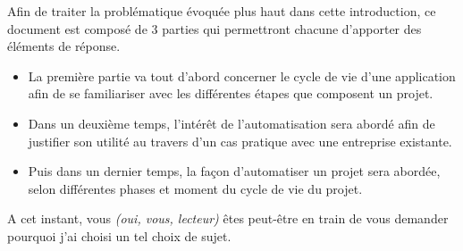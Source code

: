 Afin de traiter la problématique évoquée plus haut dans cette introduction, ce document est composé de 3 parties qui permettront chacune d'apporter des éléments de réponse. 

\begin{itemize}
	\item La première partie va tout d'abord concerner le cycle de vie d'une application afin de se familiariser avec les différentes étapes que composent un projet.
	\item Dans un deuxième temps, l'intérêt de l'automatisation sera abordé afin de justifier son utilité au travers d'un cas pratique avec une entreprise existante.
	\item Puis dans un dernier temps, la façon d'automatiser un projet sera abordée, selon différentes phases et moment du cycle de vie du projet.
\end{itemize}

A cet instant, vous \emph{(oui, vous, lecteur)} êtes peut-être en train de vous demander pourquoi j'ai choisi un tel choix de sujet. 


